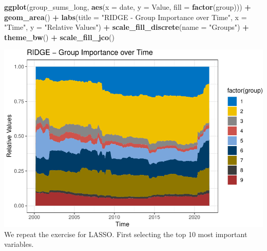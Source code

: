 \documentclass[
]{article}
\newenvironment{Shaded}{\begin{snugshade}}{\end{snugshade}}
\newcommand{\AttributeTok}[1]{\textcolor[rgb]{0.13,0.29,0.53}{#1}}
\newcommand{\FunctionTok}[1]{\textcolor[rgb]{0.13,0.29,0.53}{\textbf{#1}}}
\newcommand{\NormalTok}[1]{#1}
\newcommand{\SpecialCharTok}[1]{\textcolor[rgb]{0.81,0.36,0.00}{\textbf{#1}}}
\newcommand{\StringTok}[1]{\textcolor[rgb]{0.31,0.60,0.02}{#1}}
\begin{document}
\begin{Shaded}
\begin{Highlighting}[]
\FunctionTok{ggplot}\NormalTok{(group\_sums\_long, }\FunctionTok{aes}\NormalTok{(}\AttributeTok{x =}\NormalTok{ date, }\AttributeTok{y =}\NormalTok{ Value, }\AttributeTok{fill =} \FunctionTok{factor}\NormalTok{(group))) }\SpecialCharTok{+}
    \FunctionTok{geom\_area}\NormalTok{() }\SpecialCharTok{+} \FunctionTok{labs}\NormalTok{(}\AttributeTok{title =} \StringTok{"RIDGE {-} Group Importance over Time"}\NormalTok{,}
    \AttributeTok{x =} \StringTok{"Time"}\NormalTok{, }\AttributeTok{y =} \StringTok{"Relative Values"}\NormalTok{) }\SpecialCharTok{+} \FunctionTok{scale\_fill\_discrete}\NormalTok{(}\AttributeTok{name =} \StringTok{"Groups"}\NormalTok{) }\SpecialCharTok{+}
    \FunctionTok{theme\_bw}\NormalTok{() }\SpecialCharTok{+} \FunctionTok{scale\_fill\_jco}\NormalTok{()}
\end{Highlighting}
\end{Shaded}

\includegraphics{Trabalho_Econo4_Q2_files/figure-latex/unnamed-chunk-30-1.pdf}
We repeat the exercise for LASSO. First selecting the top 10 most
important variables.
\end{document}
